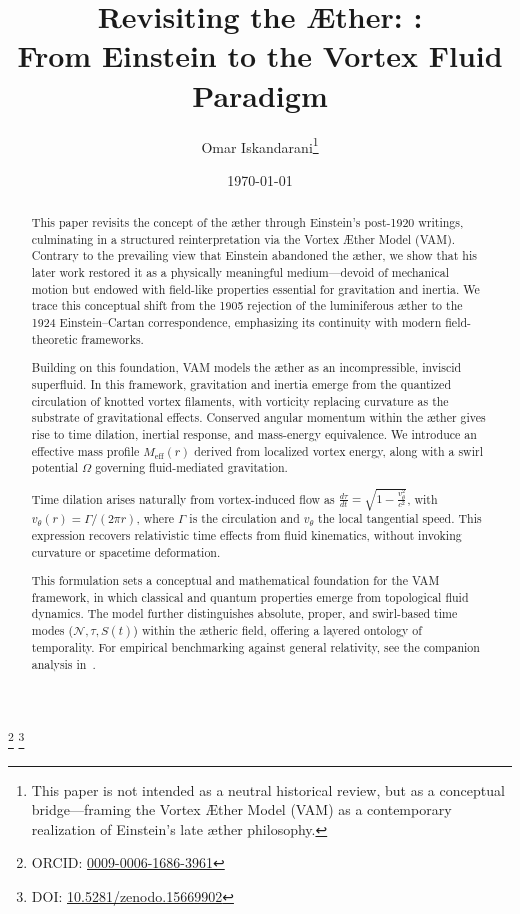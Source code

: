\documentclass[preprint]{revtex4-2}
\begin{document}
\title{Revisiting the Æther: :\\ From Einstein to the Vortex Fluid Paradigm}
\author{Omar Iskandarani\footnote{\scriptsize This paper is not intended as a neutral historical review, but as a conceptual bridge—framing the Vortex Æther Model (VAM) as a contemporary realization of Einstein’s late æther philosophy.}}
\thanks{ORCID: \href{https://orcid.org/0009-0006-1686-3961}{0009-0006-1686-3961}}
\thanks{DOI: \href{https://doi.org/10.5281/zenodo.15669902}{10.5281/zenodo.15669902}}
\date{\today}
\maketitle
\begin{abstract}
This paper revisits the concept of the æther through Einstein’s post-1920 writings, culminating in a structured reinterpretation via the Vortex Æther Model (VAM). Contrary to the prevailing view that Einstein abandoned the æther, we show that his later work restored it as a physically meaningful medium—devoid of mechanical motion but endowed with field-like properties essential for gravitation and inertia. We trace this conceptual shift from the 1905 rejection of the luminiferous æther to the 1924 Einstein–Cartan correspondence, emphasizing its continuity with modern field-theoretic frameworks.

Building on this foundation, VAM models the æther as an incompressible, inviscid superfluid. In this framework, gravitation and inertia emerge from the quantized circulation of knotted vortex filaments, with vorticity replacing curvature as the substrate of gravitational effects. Conserved angular momentum within the æther gives rise to time dilation, inertial response, and mass-energy equivalence. We introduce an effective mass profile \( M_{\text{eff}}(r) \) derived from localized vortex energy, along with a swirl potential \( \Omega \) governing fluid-mediated gravitation.

Time dilation arises naturally from vortex-induced flow as \( \frac{d\tau}{dt} = \sqrt{1 - \frac{v_\theta^2}{c^2}} \), with \( v_\theta(r) = \Gamma / (2\pi r) \), where \( \Gamma \) is the circulation and \( v_\theta \) the local tangential speed. This expression recovers relativistic time effects from fluid kinematics, without invoking curvature or spacetime deformation.

This formulation sets a conceptual and mathematical foundation for the VAM framework, in which classical and quantum properties emerge from topological fluid dynamics. The model further distinguishes absolute, proper, and swirl-based time modes (\( \mathcal{N}, \tau, S(t) \)) within the ætheric field, offering a layered ontology of temporality. For empirical benchmarking against general relativity, see the companion analysis in~\cite{iskandarani2025benchmark}.

\end{abstract}
\end{document}
